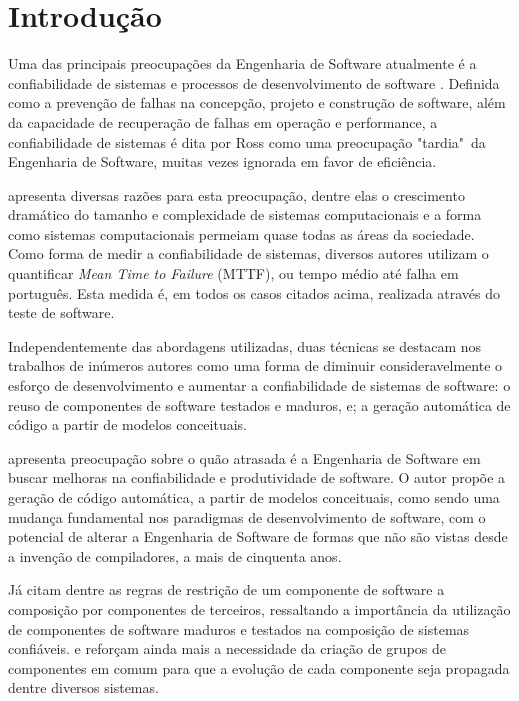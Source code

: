 \chapter{Introdução}

Uma das principais preocupações da Engenharia de Software atualmente é a confiabilidade de sistemas e processos de desenvolvimento de software \cite{ROSS:1975} \cite{SOMMERVILLE:2011}. Definida como a prevenção de falhas na concepção, projeto e construção de software, além da capacidade de recuperação de falhas em operação e performance, a confiabilidade de sistemas é dita por Ross como uma preocupação "tardia"\ da Engenharia de Software, muitas vezes ignorada em favor de eficiência.

 apresenta diversas razões para esta preocupação, dentre elas o crescimento dramático do tamanho e complexidade de sistemas computacionais e a forma como sistemas computacionais permeiam quase todas as áreas da sociedade. Como forma de medir a confiabilidade de sistemas, diversos autores \cite{LYU:1996}\cite{MUSA:1979}\cite{REUSSNER:2003} utilizam o quantificar \textit{Mean Time to Failure} (MTTF), ou tempo médio até falha em português. Esta medida é, em todos os casos citados acima, realizada através do teste de software.

Independentemente das abordagens utilizadas, duas técnicas se destacam nos trabalhos de inúmeros autores \cite{JIFENG:2005}\cite{SELIC:2003}\cite{CZARNECKI:2000}\cite{STAHL:2006}\cite{CRNKOVIC:2002a}\cite{CLEMENTS:2001} como uma forma de diminuir consideravelmente o esforço de desenvolvimento e aumentar a confiabilidade de sistemas de software: o reuso de componentes de software testados e maduros, e; a geração automática de código a partir de modelos conceituais.

 apresenta preocupação sobre o quão atrasada é a Engenharia de Software em buscar melhoras na confiabilidade e produtividade de software. O autor propõe a geração de código automática, a partir de modelos conceituais, como sendo uma mudança fundamental nos paradigmas de desenvolvimento de software, com o potencial de alterar a Engenharia de Software de formas que não são vistas desde a invenção de compiladores, a mais de cinquenta anos.

Já  citam dentre as regras de restrição de um componente de software a composição por componentes de terceiros, ressaltando a importância da utilização de componentes de software maduros e testados na composição de sistemas confiáveis.  e  reforçam ainda mais a necessidade da criação de grupos de componentes em comum para que a evolução de cada componente seja propagada dentre diversos sistemas.

